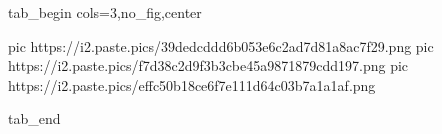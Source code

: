  
 
 
 
 


\ifcmt
  tab_begin cols=3,no_fig,center

     pic https://i2.paste.pics/39dedcddd6b053e6c2ad7d81a8ac7f29.png
		 pic https://i2.paste.pics/f7d38c2d9f3b3cbe45a9871879cdd197.png
		 pic https://i2.paste.pics/effc50b18ce6f7e111d64c03b7a1a1af.png

  tab_end
\fi

